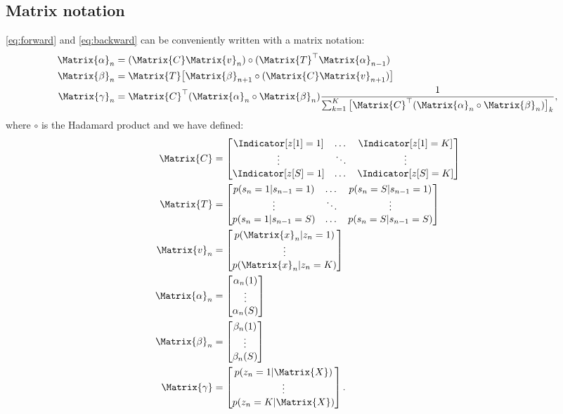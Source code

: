 \documentclass[class=article, crop=false]{standalone}
\begin{document}
\subsection{Matrix notation}
\eqref{eq:forward} and \eqref{eq:backward} can be conveniently
written with a matrix notation:
\begin{align}
    \Matrix{\alpha}_n &= (\Matrix{C} \Matrix{v}_n) \circ
        (\Matrix{T}^\top \Matrix{\alpha}_{n-1}) \\
    \Matrix{\beta}_n &= \Matrix{T} \big[ \Matrix{\beta}_{n+1} \circ
        (\Matrix{C} \Matrix{v}_{n+1}) \big] \\
    \Matrix{\gamma}_n &= \Matrix{C}^\top (\Matrix{\alpha}_n \circ \Matrix{\beta}_n)
        \frac{1}{\sum_{k=1}^K \big[ \Matrix{C}^\top (\Matrix{\alpha}_{n} \circ
        \Matrix{\beta}_n) \big]_k},
\end{align}
where $\circ$ is the Hadamard product and we have defined:
\begin{align}
    \Matrix{C} &= \begin{bmatrix}
        \Indicator[z[1] = 1] & \dots & \Indicator[z[1] = K] \\
        \vdots & \ddots & \vdots \\
        \Indicator[z[S] = 1] & \dots & \Indicator[z[S] = K]
    \end{bmatrix} \\
    \Matrix{T} &= \begin{bmatrix}
        p(s_n = 1 | s_{n-1} = 1) & \dots & p(s_n = S | s_{n-1} = 1) \\
        \vdots & \ddots & \vdots \\
        p(s_n = 1 | s_{n-1} = S) & \dots & p(s_n = S | s_{n-1} = S)
    \end{bmatrix} \\
    \Matrix{v}_n &= \begin{bmatrix}
        p(\Matrix{x}_n | z_n = 1) \\
        \vdots \\
        p(\Matrix{x}_n | z_n = K)
    \end{bmatrix} \\
    \Matrix{\alpha}_n &= \begin{bmatrix}
        \alpha_n(1) \\
        \vdots \\
        \alpha_n(S)
    \end{bmatrix} \\
    \Matrix{\beta}_n &= \begin{bmatrix}
        \beta_n(1) \\
        \vdots \\
        \beta_n(S)
    \end{bmatrix} \\
    \Matrix{\gamma} &= \begin{bmatrix}
        p(z_n = 1 | \Matrix{X}) \\
        \vdots \\
        p(z_n = K | \Matrix{X})
    \end{bmatrix}.
\end{align}
\end{document}
